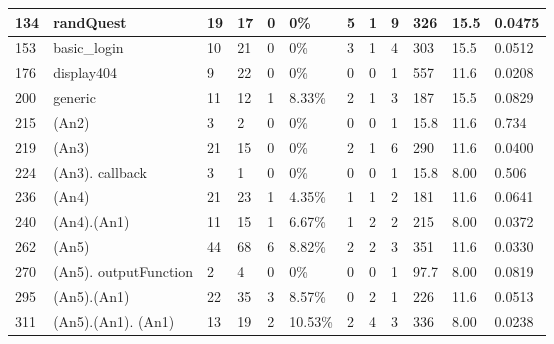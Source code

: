 \begin{tabular}{|l|p{56px}|l|l|l|l|l|l|l|l|l|l|}
\hline
       134 & randQuest &         19 &         17 &          0 &        0\% &          5 &          1 &          9 &        326 &       15.5 &     0.0475 \\
\hline
       153 & basic\_login &         10 &         21 &          0 &        0\% &          3 &          1 &          4 &        303 &       15.5 &     0.0512 \\
\hline
       176 & display404 &          9 &         22 &          0 &        0\% &          0 &          0 &          1 &        557 &       11.6 &     0.0208 \\
       \hline
       200 &    generic &         11 &         12 &          1 &     8.33\% &          2 &          1 &          3 &        187 &       15.5 &     0.0829 \\
\hline
       215 & (An2) &          3 &          2 &          0 &        0\% &          0 &          0 &          1 &       15.8 &       11.6 &      0.734 \\
\hline
       219 & (An3) &         21 &         15 &          0 &        0\% &          2 &          1 &          6 &        290 &       11.6 &     0.0400 \\
\hline
       224 & (An3). callback &          3 &          1 &          0 &        0\% &          0 &          0 &          1 &       15.8 &       8.00 &      0.506 \\
\hline
       236 & (An4) &         21 &         23 &          1 &     4.35\% &          1 &          1 &          2 &        181 &       11.6 &     0.0641 \\
\hline
       240 & (An4).(An1) &         11 &         15 &          1 &     6.67\% &          1 &          2 &          2 &        215 &       8.00 &     0.0372 \\
\hline
       262 & (An5) &         44 &         68 &          6 &     8.82\% &          2 &          2 &          3 &        351 &       11.6 &     0.0330 \\
\hline
       270 & (An5). outputFunction &          2 &          4 &          0 &        0\% &          0 &          0 &          1 &       97.7 &       8.00 &     0.0819 \\
\hline
       295 & (An5).(An1) &         22 &         35 &          3 &     8.57\% &          0 &          2 &          1 &        226 &       11.6 &     0.0513 \\
\hline
       311 & (An5).(An1). (An1) &         13 &         19 &          2 &    10.53\% &          2 &          4 &          3 &        336 &       8.00 &     0.0238 \\

\end{tabular}
